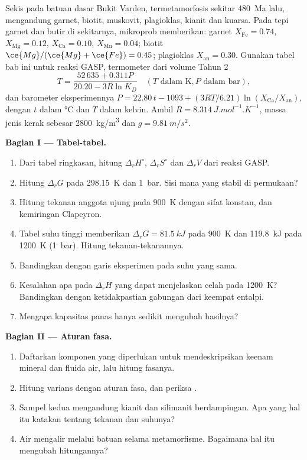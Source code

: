 \begin{problem}
\label{pb:b3:petrological-thermodynamics:1}
Sekis pada batuan dasar Bukit Varden, termetamorfosis sekitar
\qty{480}{Ma} lalu, mengandung garnet, biotit, muskovit, plagioklas, kianit dan
kuarsa. Pada tepi garnet dan butir di sekitarnya, mikroprob
memberikan: garnet $X_{\text{Fe}} = 0.74$, $X_{\text{Mg}} = 0.12$, $X_{\text{Ca}} =
0.10$, $X_{\text{Mn}} = 0.04$; biotit $\ce{Mg}/(\ce{Mg} + \ce{Fe}) = 0.45$;
plagioklas $X_{\text{an}} = 0.30$. Gunakan tabel bab ini untuk
reaksi GASP, termometer dari volume Tahun 2
\[
T = \frac{52\,635 + 0.311P}{20.20 - 3R\ln K_D}\quad(T \text{ dalam K}, P
\text{ dalam bar}),
\]
dan barometer eksperimennya $P = 22.80\,t - 1093 + (3RT/6.21)\ln
(X_{\text{Ca}}/X_{\text{an}})$, dengan $t$ dalam \unit{\celsius} dan $T$ dalam
kelvin. Ambil $R = \qty{8.314}{J.mol^{-1}.K^{-1}}$, massa jenis kerak sebesar
\qty{2800}{kg/m^3} dan $g = \qty{9.81}{m/s^2}$.

\medskip\noindent\textbf{Bagian I --- Tabel-tabel.}
\begin{enumerate}
  \item Dari tabel ringkasan, hitung $\Delta_rH^\circ$, $\Delta_rS^\circ$
        dan $\Delta_rV$ dari reaksi GASP.
  \item Hitung $\Delta_rG$ pada \qty{298.15}{K} dan \qty{1}{bar}. Sisi mana
        yang stabil di permukaan?
  \item Hitung tekanan anggota ujung pada \qty{900}{K} dengan sifat konstan,
        dan kemiringan Clapeyron.
  \item Tabel suhu tinggi memberikan $\Delta_rG = \qty{81.5}{kJ}$ pada
        \qty{900}{K} dan \qty{119.8}{kJ} pada \qty{1200}{K} (\qty{1}{bar}).
        Hitung tekanan-tekanannya.
  \item Bandingkan dengan garis eksperimen pada suhu yang sama.
  \item Kesalahan apa pada $\Delta_rH$ yang dapat menjelaskan celah pada \qty{1200}{K}?
        Bandingkan dengan ketidakpastian gabungan dari keempat entalpi.
  \item Mengapa kapasitas panas hanya sedikit mengubah hasilnya?
\end{enumerate}

\medskip\noindent\textbf{Bagian II --- Aturan fasa.}
\begin{enumerate}[resume]
  \item Daftarkan komponen yang diperlukan untuk mendeskripsikan keenam mineral dan
        fluida air, lalu hitung fasanya.
  \item Hitung varians dengan aturan fasa, dan periksa .
  \item Sampel kedua mengandung kianit dan silimanit berdampingan. Apa yang
        hal itu katakan tentang tekanan dan suhunya?
  \item Air mengalir melalui batuan selama metamorfisme. Bagaimana hal itu
        mengubah hitungannya?
\end{enumerate}


\end{problem}
